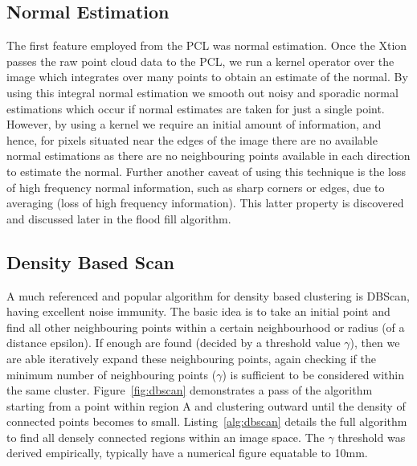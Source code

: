 \documentclass[]{article}
\begin{document}
{\subsection{Normal Estimation} %
\label{sub:normal_estimation}

The first feature employed from the PCL was normal estimation. Once the Xtion passes the raw point cloud data to the PCL, we run a kernel operator over the image which integrates over many points to obtain an estimate of the normal. By using this integral normal estimation we smooth out noisy and sporadic normal estimations which occur if normal estimates are taken for just a single point. However, by using a kernel we require an initial amount of information, and hence, for pixels situated near the edges of the image there are no available normal estimations as there are no neighbouring points available in each direction to estimate the normal. Further another caveat of using this technique is the loss of high frequency normal information, such as sharp corners or edges, due to averaging (loss of high frequency information). This latter property is discovered and discussed later in the flood fill algorithm. 
\subsection{Density Based Scan} %
\label{sub:density_based_scan}

A much referenced and popular algorithm for density based clustering is DBScan, having excellent noise immunity. The basic idea is to take an initial point and find all other neighbouring points within a certain neighbourhood or radius (of a distance epsilon). If enough are found (decided by a threshold value $\gamma$), then we are able iteratively expand these neighbouring points, again checking if the minimum number of neighbouring points ($\gamma$) is sufficient to be considered within the same cluster. Figure~\ref{fig:dbscan} demonstrates a pass of the algorithm starting from a point within region A and clustering outward until the density of connected points becomes to small. Listing~\ref{alg:dbscan} details the full algorithm to find all densely connected regions within an image space. The $\gamma$ threshold was derived empirically, typically have a numerical figure equatable to 10mm.  


}
\end{document}
